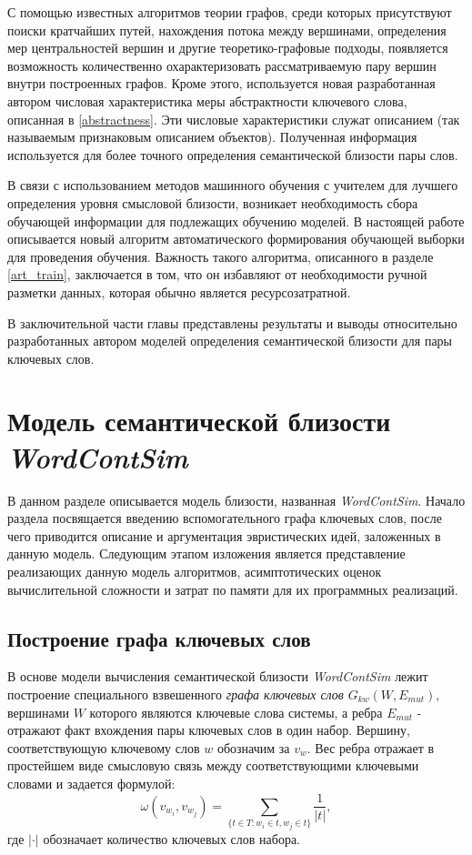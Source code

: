 С помощью известных алгоритмов теории графов, среди которых присутствуют поиски кратчайших путей, нахождения потока между вершинами, определения мер центральностей вершин и другие теоретико-графовые подходы, появляется возможность количественно охарактеризовать рассматриваемую пару вершин внутри построенных графов. Кроме этого, используется новая разработанная автором числовая характеристика меры абстрактности ключевого слова, описанная в \ref{abstractness}. Эти числовые характеристики служат описанием (так называемым признаковым описанием объектов). Полученная информация используется для более точного определения семантической близости пары слов.

В связи с использованием методов машинного обучения с учителем для лучшего определения уровня смысловой близости, возникает необходимость сбора обучающей информации для подлежащих обучению моделей. В настоящей работе описывается новый алгоритм автоматического формирования обучающей выборки для проведения обучения. Важность такого алгоритма, описанного в разделе \ref{art_train}, заключается в том, что он избавляют от необходимости ручной разметки данных, которая обычно является ресурсозатратной.

В заключительной части главы представлены результаты и выводы относительно разработанных автором моделей определения семантической близости для пары ключевых слов.

\section{Модель семантической близости \emph{WordContSim}} \label{wordcontsim}
В данном разделе описывается модель близости, названная \emph{WordContSim}. Начало раздела посвящается введению вспомогательного графа ключевых слов, после чего приводится описание и аргументация эвристических идей, заложенных в данную модель. Следующим этапом изложения является представление реализающих данную модель алгоритмов, асимптотических оценок вычислительной сложности и затрат по памяти для их программных реализаций.

\subsection{Построение графа ключевых слов} \label{sect1_1}

В основе модели вычисления семантической близости \emph{WordContSim} лежит построение специального взвешенного \emph{графа ключевых слов} $G_{kw}(W, E_{mut})$, вершинами $W$ которого являются ключевые слова системы, а ребра $E_{mut}$ - отражают факт вхождения пары ключевых слов в один набор. Вершину, соответствующую ключевому слов $w$ обозначим за $v_w$. Вес ребра отражает в простейшем виде смысловую связь между соответствующими ключевыми словами и  задается формулой:
\begin{equation}\label{tag_graph_weight}
\omega(v_{w_i}, v_{w_j}) = \sum_{\{t \in T : w_i \in t , w_j \in t\}}\frac{1}{|t|},
\end{equation}
где $|\cdot|$ обозначает количество ключевых слов набора.

